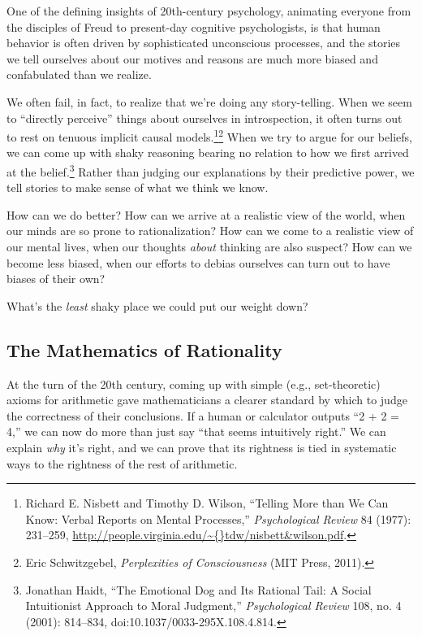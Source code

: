 {
 One of the defining insights of 20th-century psychology, animating
everyone from the disciples of Freud to present-day cognitive
psychologists, is that human behavior is often driven by sophisticated
unconscious processes, and the stories we tell ourselves about our
motives and reasons are much more biased and confabulated than we
realize.}

{
 We often fail, in fact, to realize that we're
doing any story-telling. When we seem to ``directly
perceive'' things about ourselves in introspection,
it often turns out to rest on tenuous implicit causal
models.\footnote{Richard E. Nisbett and Timothy D. Wilson,
``Telling More than We Can Know: Verbal Reports on
Mental Processes,'' \textit{Psychological Review} 84
(1977): 231--259,
\url{http://people.virginia.edu/\~{}tdw/nisbett\&wilson.pdf}.}\supercomma\footnote{Eric Schwitzgebel, \textit{Perplexities of Consciousness} (MIT
Press, 2011).} When we try to argue for our beliefs, we
can come up with shaky reasoning bearing no relation to how we first
arrived at the belief.\footnote{Jonathan Haidt, ``The Emotional Dog and Its
Rational Tail: A Social Intuitionist Approach to Moral
Judgment,'' \textit{Psychological Review} 108, no. 4
(2001): 814--834, doi:10.1037/0033-295X.108.4.814.} Rather than judging our
explanations by their predictive power, we tell stories to make sense
of what we think we know.}

{
 How can we do better? How can we arrive at a realistic view of the
world, when our minds are so prone to rationalization? How can we come
to a realistic view of our mental lives, when our thoughts
\textit{about} thinking are also suspect? How can we become less
biased, when our efforts to debias ourselves can turn out to have
biases of their own?}

{
 What's the \textit{least} shaky place we could put
our weight down?}


\subsection{The Mathematics of Rationality}

{
 At the turn of the 20th century, coming up with simple (e.g.,
set-theoretic) axioms for arithmetic gave mathematicians a clearer
standard by which to judge the correctness of their conclusions. If a
human or calculator outputs ``2 + 2 =
4,'' we can now do more than just say
``that seems intuitively right.'' We
can explain \textit{why} it's right, and we can prove
that its rightness is tied in systematic ways to the rightness of the
rest of arithmetic.}

